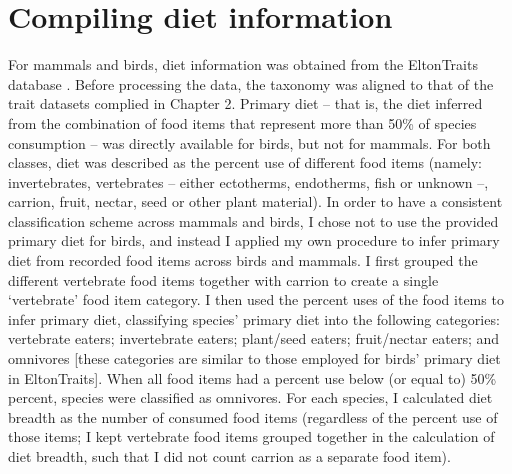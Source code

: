 \section{Compiling diet information}

For mammals and birds, diet information was obtained from the EltonTraits database \citep{Wilman2014}. Before processing the data, the taxonomy was aligned to that of the trait datasets complied in Chapter 2. Primary diet -- that is, the diet inferred from the combination of food items that represent more than 50\% of species consumption -- was directly available for birds, but not for mammals. For both classes, diet was described as the percent use of different food items (namely: invertebrates, vertebrates -- either ectotherms, endotherms, fish or unknown --, carrion, fruit, nectar, seed or other plant material). In order to have a consistent classification scheme across mammals and birds, I chose not to use the provided primary diet for birds, and instead I applied my own procedure to infer primary diet from recorded food items across birds and mammals. I first grouped the different vertebrate food items together with carrion to create a single `vertebrate' food item category. I then used the percent uses of the food items to infer primary diet, classifying species’ primary diet into the following categories: vertebrate eaters; invertebrate eaters; plant/seed eaters; fruit/nectar eaters; and omnivores [these categories are similar to those employed for birds' primary diet in EltonTraits]. When all food items had a percent use below (or equal to) 50\% percent, species were classified as omnivores. %
 For each species, I calculated diet breadth as the number of consumed food items (regardless of the percent use of those items; I kept vertebrate food items grouped together in the calculation of diet breadth, such that I did not count carrion as a separate food item). %


